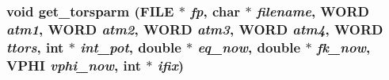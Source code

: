 \subsubsection{\setlength{\rightskip}{0pt plus 5cm}void get\_\-torsparm (FILE $\ast$ {\em fp}, char $\ast$ {\em filename}, {\bf WORD} {\em atm1}, {\bf WORD} {\em atm2}, {\bf WORD} {\em atm3}, {\bf WORD} {\em atm4}, {\bf WORD} {\em ttors}, int $\ast$ {\em int\_\-pot}, double $\ast$ {\em eq\_\-now}, double $\ast$ {\em fk\_\-now}, {\bf VPHI} {\em vphi\_\-now}, int $\ast$ {\em ifix})}\label{input_2md__getparm_8c_7251b806659f7208ad9e2e6547927ef0}


